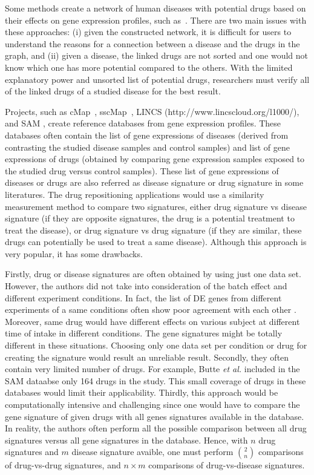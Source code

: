 Some methods create a network of human diseases with potential drugs based on their effects on gene expression profiles, such as~\cite{hu2009human, iorio2010identification, iorio2010discovery}. There are two main issues with these approaches: (i) given the constructed network, it is difficult for users to understand the reasons for a connection between a disease and the drugs in the graph, and (ii) given a disease, the linked drugs are not sorted and one would not know which one has more potential compared to the others. With the limited explanatory power and unsorted list of potential drugs, researchers must verify all of the linked drugs of a studied disease for the best result. 

Projects, such as cMap~\cite{lamb2007connectivity, lamb2006connectivity}, sscMap~\cite{zhang2009sscmap}, LINCS (http://www.lincscloud.org/l1000/), and SAM \cite{sirota2011discovery}, create reference databases from gene expression profiles. These databases often contain the list of gene expressions of diseases (derived from contrasting the studied disease  samples and control samples) and list of gene expressions of drugs (obtained by comparing gene expression samples exposed to the studied drug versus control samples). These list of gene expressions of diseases or drugs are also referred as disease signature or drug signature in some literatures. The drug repositioning applications would use a similarity measurement method to compare two signatures, either drug signature vs disease signature (if they are opposite signatures, the drug is a potential treatment to treat the disease), or drug signature vs drug signature (if they are similar, these drugs can potentially be used to treat a same disease). Although this approach is very popular, it has some drawbacks. 

Firstly, drug or disease signatures are often obtained by using just one data set. However, the authors did not take into consideration of the batch effect and different experiment conditions. In fact, the list of DE genes from different experiments of a same conditions often show poor agreement with each other \cite{ein2005outcome}. Moreover, same drug would have different effects on various subject at different time of intake in different conditions. The gene signatures might be totally different in these situations.
Choosing only one data set per condition or drug for creating the signature would result an unreliable result.
Secondly, they often contain very limited number of drugs. For example, Butte \textit{et al.} included in the SAM dataabse only 164 drugs in the study. This small coverage of drugs in these databases would limit their applicability.
Thirdly,  this approach would be computationally intensive and challenging since one would have to compare the gene signature of given drugs with all genes signatures available in the database. In reality, the authors often perform all the  possible comparison between all drug signatures versus all gene signatures in the database. Hence, with $n$ drug signatures and $m$ disease signature avaible, one must perform $\binom 2n$ comparisons of drug-vs-drug signatures, and $n \times m$ comparisons of drug-vs-disease signatures.  

